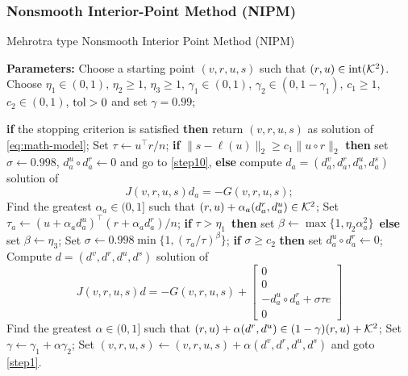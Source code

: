  \begin{frame}
   \frametitle{Nonsmooth Interior-Point Method (NIPM)}
   
   \begin{algorithm}[H]
     \scriptsize
  \caption{Mehrotra type Nonsmooth Interior Point Method (NIPM)}
  \label{alg:IP}
  \textbf{Parameters:} Choose a starting point $(v,r,u,s)$ such that $(r,u)\in{\rm int}({\cal K}^2)$. Choose $\eta_1\in(0,1)$, $\eta_2\geq 1$, $\eta_3\geq 1$, $\gamma_1\in(0,1)$, $\gamma_2\in (0,1-\gamma_1)$, $c_1\geq 1$, $c_2\in(0,1)$, $\rm{tol}>0$ and set $\gamma = 0.99$;
  \begin{algorithmic}[1]
    \State\label{step1}{\bf if} the stopping criterion is satisfied {\bf then} return $(v,r,u,s)$ as solution of \eqref{eq:math-model}; 
    \State\label{step2} Set $\tau\leftarrow u^\top r / n$;
    \State\label{step3} {\bf if} $\|s-\ell(u)\|_2 \geq c_1 \| u \circ r\|_2$ {\bf then} set $\sigma \leftarrow 0.998$, $d^u_a \circ d^r_a \leftarrow 0$ and go to \ref{step10},
    \State\label{step4} {\bf else} compute $d_a=(d^v_a,d^r_a,d^u_a,d^s_a)$ solution of
    \begin{displaymath}
      J(v,r,u,s) d_a = -G(v,r,u,s);
    \end{displaymath}
    \State\label{step5} Find the greatest $\alpha_a\in(0,1]$ such that $(r,u)+\alpha_a(d_a^r,d_a^u) \in {\cal K}^2$;
    \State\label{step6} Set $\tau_a \leftarrow  (u+\alpha_a d^u_a)^\top(r+\alpha_a d^r_a)/n$;
    \State\label{step7} {\bf if} {$\tau>\eta_1$}\,  {\bf then} set $\beta\leftarrow \max\{1,\eta_2 \alpha_a^2\}$\, {\bf else} set $\beta \leftarrow \eta_3$;
    \State\label{step8} Set $\sigma \leftarrow 0.998\min\{1,(\tau_a/\tau)^\beta\}$;
    \State\label{step9} {\bf if}  $\sigma \geq c_2$  {\bf then} set $d^u_a \circ d^r_a \leftarrow 0$;
    \State\label{step10} Compute $d=(d^v,d^r,d^u,d^s)$ solution of
    \begin{equation}
      \label{eq:JdG}
      J(v,r,u,s) d = -G(v,r,u,s)+\left[\begin{smallmatrix} 0\\0\\-d^u_a \circ d^r_a + \sigma\tau e\\ 0\end{smallmatrix}\right]
    \end{equation}
    \State\label{step11} Find the greatest $\alpha\in(0,1]$ such that $(r,u)+\alpha(d^r,d^u) \in (1-\gamma)(r,u) + {\cal K}^{2}$;
    \State\label{step12} Set $\gamma \leftarrow \gamma_1 + \alpha \gamma_2$;
    \State\label{step13} Set $(v,r,u,s) \leftarrow (v,r,u,s) + \alpha (d^v, d^r,d^u,d^s)$ and goto \ref{step1}.
   \end{algorithmic}
 \end{algorithm}

 \end{frame}



